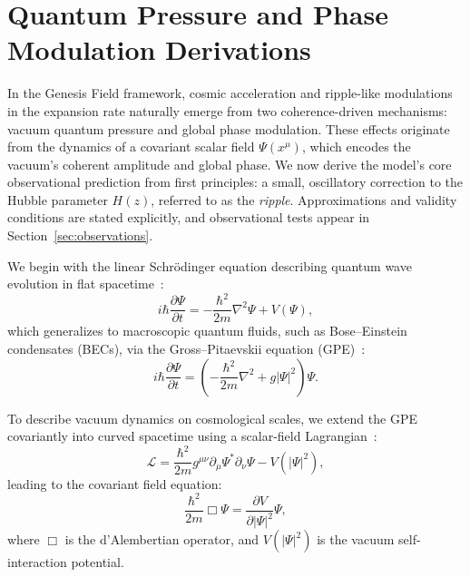 \section{Quantum Pressure and Phase Modulation Derivations}
\label{sec:derivations}

In the Genesis Field framework, cosmic acceleration and ripple-like modulations in the expansion rate naturally emerge from two coherence-driven mechanisms: vacuum quantum pressure and global phase modulation. These effects originate from the dynamics of a covariant scalar field \( \Psi(x^\mu) \), which encodes the vacuum's coherent amplitude and global phase. We now derive the model’s core observational prediction from first principles: a small, oscillatory correction to the Hubble parameter \( H(z) \), referred to as the \emph{ripple}. Approximations and validity conditions are stated explicitly, and observational tests appear in Section~\ref{sec:observations}.

We begin with the linear Schrödinger equation describing quantum wave evolution in flat spacetime~\cite{Schrodinger1926}:
\begin{equation}
i\hbar \frac{\partial \Psi}{\partial t} = -\frac{\hbar^2}{2m}\nabla^2\Psi + V(\Psi),
\label{eq:schrodinger}
\end{equation}
which generalizes to macroscopic quantum fluids, such as Bose–Einstein condensates (BECs), via the Gross–Pitaevskii equation (GPE)~\cite{Gross1961,Pitaevskii1961}:
\begin{equation}
i\hbar \frac{\partial \Psi}{\partial t} = \left(-\frac{\hbar^2}{2m}\nabla^2 + g|\Psi|^2\right)\Psi.
\label{eq:gpe}
\end{equation}

To describe vacuum dynamics on cosmological scales, we extend the GPE covariantly into curved spacetime using a scalar-field Lagrangian~\cite{Barcelo2005,volovik2003universe}:
\begin{equation}
\mathcal{L} = \frac{\hbar^2}{2m} g^{\mu\nu} \partial_\mu \Psi^* \partial_\nu \Psi - V(|\Psi|^2),
\label{eq:genesis_lagrangian}
\end{equation}
leading to the covariant field equation:
\begin{equation}
\frac{\hbar^2}{2m}\Box\Psi = \frac{\partial V}{\partial |\Psi|^2}\Psi,
\label{eq:field_equation}
\end{equation}
where \( \Box \) is the d'Alembertian operator, and \( V(|\Psi|^2) \) is the vacuum self-interaction potential.

